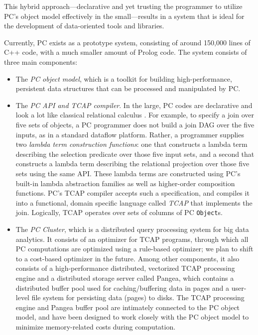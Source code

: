 This hybrid approach---declarative and yet trusting the programmer
to utilize PC's object model effectively
in the small---results in a system that is ideal for the 
development of data-oriented tools and libraries.

Currently, PC exists as a prototype system, consisting of around
150,000 lines of C++ code, with a much smaller amount of Prolog code.
The system consists of three main components: 

\begin{itemize}
\item The \emph{PC object model}, which is a toolkit for building high-performance, persistent data structures that can be 
processed and manipulated by PC.  

\item The \emph{PC API and TCAP compiler}.  In the large, PC codes are declarative and look a lot like classical relational calculus \cite{codd1971data}.  For example, to specify a join over five sets of objects, a PC programmer does not build a join DAG over the five inputs, as in a standard
dataflow platform.  Rather, a programmer 
supplies two \emph{lambda term construction functions}: one that constructs a lambda term describing the selection
predicate over those five input sets, 
and a second that constructs a lambda term describing the relational projection over those five sets
using the same API.  These lambda terms are constructed using PC's built-in lambda abstraction families as well as higher-order composition functions.
 PC's TCAP compiler 
accepts such a specification, and compiles it into a functional, domain specific language called \emph{TCAP} that implements
the join.  Logically, TCAP operates over
sets of columns of PC \texttt{Object}s. 

\item The \emph{PC Cluster}, which is a distributed query processing
  system for big data analytics. It consists of an optimizer for TCAP
  programs, through which all PC computations are optimized using a rule-based
optimizer; we plan to shift to a cost-based optimizer in the
future. Among other components, it also consists of a
high-performance distributed, vectorized TCAP processing engine and a distributed
storage server called Pangea, which contains a distributed buffer
pool used for caching/buffering data in pages and a user-level file system
for persisting data (pages) to disks. 
The TCAP processing engine and Pangea buffer pool are intimately connected to the PC object model, 
and have been designed to work closely with the PC object model to minimize memory-related costs during computation.


\end{itemize}

